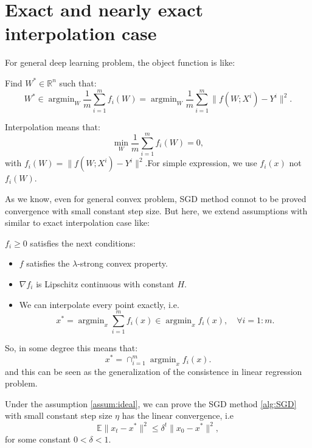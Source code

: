 \section{Exact and nearly exact interpolation case}

For general deep learning problem, the object function is like:
\begin{problem}
	Find $W^* \in \mathbb{R}^n$ such that:
	\begin{equation}
	W^* \in \mathop{\arg\min}_{W} \frac{1}{m}\sum_{i=1}^mf_i(W) = \mathop{\arg\min}_{W} \frac{1}{m}\sum_{i=1}^m \|f(W;X^i) - Y^i\|^2.
	\end{equation}
\end{problem}

Interpolation means that:
\begin{equation}
\min_{W} \frac{1}{m}\sum_{i=1}^mf_i(W) = 0,
\end{equation}
with $f_i(W) =  \|f(W;X^i) - Y^i\|^2$.For simple expression, we use $f_i(x)$ not $f_i(W)$.

As we know, even for general convex problem, SGD method connot to be proved convergence with small constant step size. But here, we extend assumptions with similar to exact interpolation case like:
\begin{assumption}\label{assum:ideal}
	$f_i \ge 0$ satisfies the next conditions:
	\begin{itemize}
		\item $ f$ satisfies the $\lambda$-strong convex property.
		\item $\nabla f_i$ is Lipschitz continuous with constant $H$.
		\item We can interpolate every point exactly, i.e.
		\begin{equation}
		x^* = \mathop{\arg\min}_{x} \sum_{i=1}^mf_i(x)  \in \mathop{\arg\min}_{x} f_i(x), \quad \forall i  =  1:m.
		\end{equation}
	\end{itemize}
\end{assumption}

So, in some degree this means that:
\begin{equation}
x^* = \cap_{i=1}^m \mathop{\arg\min}_{x} f_i(x).
\end{equation}
and this can be seen as the generalization of the consistence in linear regression problem. 
\begin{theorem}
	Under the assumption \ref{assum:ideal}, we can prove the SGD method \ref{alg:SGD} with small constant step size $\eta$ has the linear convergence, i.e 
	\begin{equation}
	\mathbb{E}\|x_t - x^*\|^2 \le \delta^t \|x_0 - x^*\|^2,
	\end{equation}
	for some constant $ 0 < \delta < 1$.
\end{theorem}

